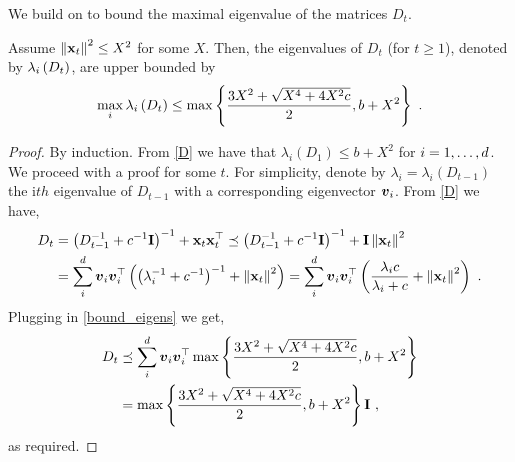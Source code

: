 We build on  to bound the maximal eigenvalue of the
matrices $D_{t}$.
\begin{lemma}
\label{eigen_values_lemma}
Assume $\left\Vert {\mathbf{x}_{t}} \right\Vert^2 \leq X^2$ for some $X$. Then, the eigenvalues
of $D_{t}$ (for $t \geq 1$), denoted by $\lambda_i\left({D_{t}}\right)$, are upper bounded
by
\[\max_i\lambda_i\left({D_{t}}\right)\leq\max\left\{{ \frac{3X^2 +
  \sqrt{X^4+4X^2 c}}{2},b+X^2}\right\} ~. \]
\end{lemma}
\begin{proof}
  By induction.  From \eqref{D} we have that
  $\lambda_i(D_{1}) \leq b + X^2$  for
$i=1, \ldots , d$. We proceed with a proof for some $t$. For simplicity,
denote by $\lambda_i = \lambda_i(D_{t-1})$ the i$th$
eigenvalue of $D_{t-1}$ with a corresponding
eigenvector ${\boldsymbol{v}}_{i}$.
From \eqref{D} we have,
\begin{align}
D_{t}
&=\left(D_{t-1}^{-1}+c^{-1}\mathbf{I}\right)^{-1}+\mathbf{x}_{t}{\mathbf{x}}^{\top}_{t} \preceq \left(D_{t-1}^{-1}+c^{-1}\mathbf{I}\right)^{-1}  +
\mathbf{I} \left\Vert {\mathbf{x}_{t}} \right\Vert^2\nonumber\\
& = \sum_i^d {\boldsymbol{v}}_{i}
{{\boldsymbol{v}}}^{\top}_{i}\left({\left({\lambda_i^{-1} + c^{-1}}\right)^{-1} + \left\Vert {\mathbf{x}_{t}} \right\Vert^2}\right)= \sum_i^d {\boldsymbol{v}}_{i}
{{\boldsymbol{v}}}^{\top}_{i}\left({ \frac{\lambda_i c }{\lambda_i + c} +
  \left\Vert {\mathbf{x}_{t}} \right\Vert^2}\right) ~.\label{bound_eigens}
\end{align}
Plugging   in \eqref{bound_eigens} we get,
\begin{align*}
D_{t}
&\preceq \sum_i^d {\boldsymbol{v}}_{i}
{{\boldsymbol{v}}}^{\top}_{i}\max\left\{{ \frac{3X^2 +
  \sqrt{X^4+4X^2 c}}{2},b+X^2}\right\}\\
&= \max\left\{{ \frac{3X^2 +
  \sqrt{X^4+4X^2 c}}{2},b+X^2}\right\} \mathbf{I}~,
\end{align*}
as required.
\QED
\end{proof}


